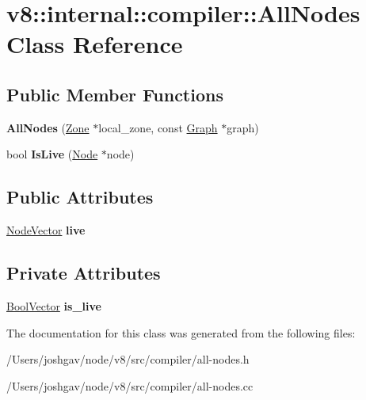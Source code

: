 \hypertarget{classv8_1_1internal_1_1compiler_1_1_all_nodes}{}\section{v8\+:\+:internal\+:\+:compiler\+:\+:All\+Nodes Class Reference}
\label{classv8_1_1internal_1_1compiler_1_1_all_nodes}
\subsection*{Public Member Functions}
\begin{DoxyCompactItemize}
\item 
{\bfseries All\+Nodes} (\hyperlink{classv8_1_1internal_1_1_zone}{Zone} $\ast$local\+\_\+zone, const \hyperlink{classv8_1_1internal_1_1compiler_1_1_graph}{Graph} $\ast$graph)\hypertarget{classv8_1_1internal_1_1compiler_1_1_all_nodes_a3b882faab79c9cab2b1d21f45120d87f}{}\label{classv8_1_1internal_1_1compiler_1_1_all_nodes_a3b882faab79c9cab2b1d21f45120d87f}

\item 
bool {\bfseries Is\+Live} (\hyperlink{classv8_1_1internal_1_1compiler_1_1_node}{Node} $\ast$node)\hypertarget{classv8_1_1internal_1_1compiler_1_1_all_nodes_af01fc377c76f6e40af7148085c6f58fa}{}\label{classv8_1_1internal_1_1compiler_1_1_all_nodes_af01fc377c76f6e40af7148085c6f58fa}

\end{DoxyCompactItemize}
\subsection*{Public Attributes}
\begin{DoxyCompactItemize}
\item 
\hyperlink{classv8_1_1internal_1_1_zone_vector}{Node\+Vector} {\bfseries live}\hypertarget{classv8_1_1internal_1_1compiler_1_1_all_nodes_a8d081eabc413fca190f999e26a5e61b8}{}\label{classv8_1_1internal_1_1compiler_1_1_all_nodes_a8d081eabc413fca190f999e26a5e61b8}

\end{DoxyCompactItemize}
\subsection*{Private Attributes}
\begin{DoxyCompactItemize}
\item 
\hyperlink{classv8_1_1internal_1_1_zone_vector}{Bool\+Vector} {\bfseries is\+\_\+live}\hypertarget{classv8_1_1internal_1_1compiler_1_1_all_nodes_a1b92888635b4f7c74367393dab98bd12}{}\label{classv8_1_1internal_1_1compiler_1_1_all_nodes_a1b92888635b4f7c74367393dab98bd12}

\end{DoxyCompactItemize}


The documentation for this class was generated from the following files\+:\begin{DoxyCompactItemize}
\item 
/\+Users/joshgav/node/v8/src/compiler/all-\/nodes.\+h\item 
/\+Users/joshgav/node/v8/src/compiler/all-\/nodes.\+cc\end{DoxyCompactItemize}
